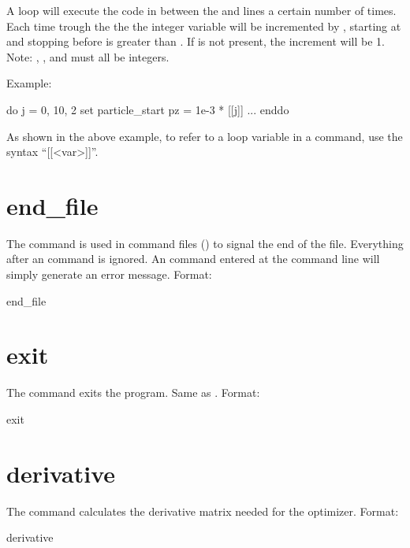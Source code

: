 A loop will execute the code in between the  and  lines a certain number of
times. Each time trough the the the integer variable  will be incremented by ,
starting at  and stopping before  is greater than . If
 is not present, the increment will be 1. Note: , , and
 must all be integers.

Example:
\begin{example}
  do j = 0, 10, 2
    set particle_start pz = 1e-3 * [[j]]
    ...
  enddo
\end{example}
As shown in the above example, to refer to a loop variable in a command, use the syntax ``[[<var>]]''.

\section{end_file} \label{s:end.file}

The  command is used in command files () to signal the end of the
file. Everything after an  command is ignored. An  command entered at the
command line will simply generate an error message.  Format:
\begin{example}
  end_file
\end{example}

\section{exit}
\label{s:exit}

The  command exits the program. Same as .  Format:
\begin{example}
  exit
\end{example}

\section{derivative}
\label{s:deriv}

The  command calculates the  derivative matrix needed for the
 optimizer.  Format:
\begin{example}
  derivative
\end{example}

